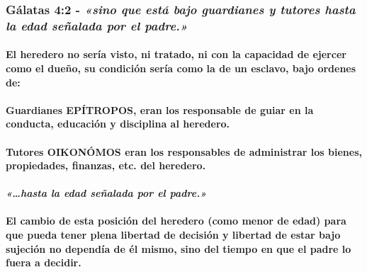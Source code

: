 \documentclass[11a pt,twoside]{article}
\newcommand{\scripture}[1]{%
  {\fontsize{12pt}{16pt}\selectfont\ScriptureFont\itshape #1}%
}
\let\oldsubsubsection\subsubsection
\renewcommand{\subsubsection}{\needspace{4\baselineskip}\oldsubsubsection}
\let\oldparagraph\paragraph
\renewcommand{\paragraph}{\needspace{3\baselineskip}\oldparagraph}
\begin{document}
\subsubsection{\texorpdfstring{Gálatas 4:2 -
\scripture{«sino que está bajo guardianes y tutores hasta la edad señalada por el padre.»}}{Gálatas 4:2 - }}\label{guxe1latas-42---sino-que-estuxe1-bajo-guardianes-y-tutores-hasta-la-edad-seuxf1alada-por-el-padre.}

\paragraph{El heredero no sería visto, ni tratado, ni con la capacidad
de ejercer como el dueño, su condición sería como la de un esclavo, bajo
ordenes
de:}\label{el-heredero-no-seruxeda-visto-ni-tratado-ni-con-la-capacidad-de-ejercer-como-el-dueuxf1o-su-condiciuxf3n-seruxeda-como-la-de-un-esclavo-bajo-ordenes-de}

\paragraph{Guardianes EPÍTROPOS, eran los responsable de guiar en la
conducta, educación y disciplina al
heredero.}\label{guardianes-epuxedtropos-eran-los-responsable-de-guiar-en-la-conducta-educaciuxf3n-y-disciplina-al-heredero.}

\paragraph{Tutores OIKONÓMOS eran los responsables de administrar los
bienes, propiedades, finanzas, etc. del
heredero.}\label{tutores-oikonuxf3mos-eran-los-responsables-de-administrar-los-bienes-propiedades-finanzas-etc.-del-heredero.}

\paragraph{\texorpdfstring{\scripture{«…hasta la edad señalada por el padre.»}}{}}\label{hasta-la-edad-seuxf1alada-por-el-padre.}

\paragraph{El cambio de esta posición del heredero (como menor de edad)
para que pueda tener plena libertad de decisión y libertad de estar bajo
sujeción no dependía de él mismo, sino del tiempo en que el padre lo
fuera a
decidir.}\label{el-cambio-de-esta-posiciuxf3n-del-heredero-como-menor-de-edad-para-que-pueda-tener-plena-libertad-de-decisiuxf3n-y-libertad-de-estar-bajo-sujeciuxf3n-no-dependuxeda-de-uxe9l-mismo-sino-del-tiempo-en-que-el-padre-lo-fuera-a-decidir.}
\end{document}
